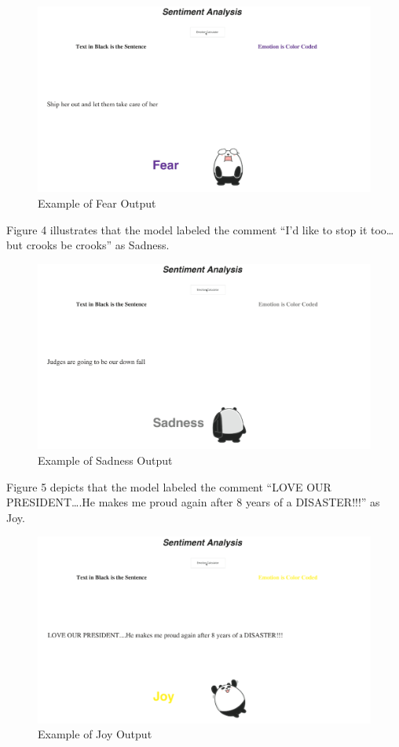 \documentclass[11pt]{article}
\begin{document}
\begin{figure}[H]
\label{fig:fear}
\caption{Example of Fear Output}
\centering
\includegraphics[scale=0.5]{images/fear.png}
\end{figure}

\newpage
\onecolumn
Figure 4 illustrates that the model labeled the comment “I’d like to stop it too… but crooks be crooks” as Sadness.

\begin{figure}[H]
\label{fig:sad}
\caption{Example of Sadness Output}
\centering
\includegraphics[scale=0.5]{images/sadness.png}
\end{figure}

\newpage
\onecolumn
Figure 5 depicts that the model labeled the comment “LOVE OUR PRESIDENT….He makes me proud again after 8 years of a DISASTER!!!” as Joy. 

\begin{figure}[H]
\label{fig:joy}
\caption{Example of Joy Output}
\centering
\includegraphics[scale=0.5]{images/joy.png}
\end{figure}
\end{document}

